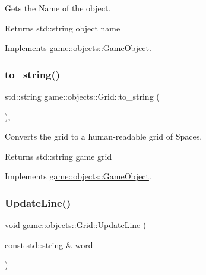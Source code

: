 Gets the Name of the object. 

\begin{DoxyReturn}{Returns}
std\+::string object name 
\end{DoxyReturn}


Implements \hyperlink{classgame_1_1objects_1_1GameObject_abc967efcbc66ec93c8592ad785aeb953}{game\+::objects\+::\+Game\+Object}.

\mbox{\label{classgame_1_1objects_1_1Grid_a3ecc419e20319a116b0a467e064e0403}} 
\subsubsection{\texorpdfstring{to\+\_\+string()}{to\_string()}}
{\footnotesize\ttfamily std\+::string game\+::objects\+::\+Grid\+::to\+\_\+string (\begin{DoxyParamCaption}{ }\end{DoxyParamCaption})\hspace{0.3cm}{\ttfamily [override]}, {\ttfamily [virtual]}}



Converts the grid to a human-\/readable grid of Spaces. 

\begin{DoxyReturn}{Returns}
std\+::string game grid 
\end{DoxyReturn}


Implements \hyperlink{classgame_1_1objects_1_1GameObject_a59faf4c33c2c0d8a9d52a26029d1488f}{game\+::objects\+::\+Game\+Object}.

\mbox{\label{classgame_1_1objects_1_1Grid_a4ac6a9c2fcd4fac310ff3ebbe02eb56d}} 
\subsubsection{\texorpdfstring{Update\+Line()}{UpdateLine()}}
{\footnotesize\ttfamily void game\+::objects\+::\+Grid\+::\+Update\+Line (\begin{DoxyParamCaption}\item[{const std\+::string \&}]{word }\end{DoxyParamCaption})}



